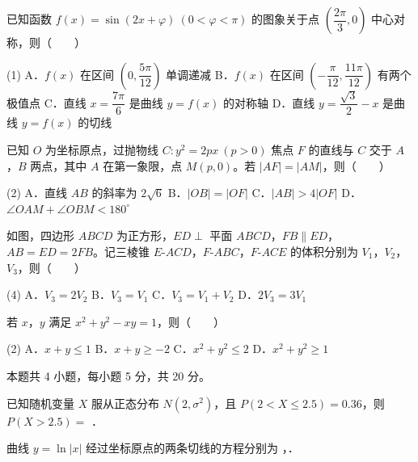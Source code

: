 已知函数 $f(x)=\sin(2x+\varphi)\ (0<\varphi<\pi)$ 的图象关于点 $\left(\dfrac{2\pi}3,0\right)$ 中心对称，则（　　）

\begin{gkopts}(1)
\task A．$f(x)$ 在区间 $\left(0,\dfrac{5\pi}{12}\right)$ 单调递减
\task B．$f(x)$ 在区间 $\left(-\dfrac\pi{12},\dfrac{11\pi}{12}\right)$ 有两个极值点
\task C．直线 $x=\dfrac{7\pi}6$ 是曲线 $y=f(x)$ 的对称轴
\task D．直线 $y=\dfrac{\sqrt3}2-x$ 是曲线 $y=f(x)$ 的切线
\end{gkopts}

已知 $O$ 为坐标原点，过抛物线 $C:y^{2}=2px\ (p>0)$ 焦点 $F$ 的直线与 $C$ 交于 $A$，$B$ 两点，其中 $A$ 在第一象限，点 $M(p,0)$。若 $|AF|=|AM|$，则（　　）

\begin{gkopts}(2)
\task A．直线 $AB$ 的斜率为 $2\sqrt6$
\task B．$|OB|=|OF|$
\task C．$|AB|>4|OF|$
\task D．$\angle OAM+\angle OBM<180^\circ$
\end{gkopts}

如图，四边形 $ABCD$ 为正方形，$ED\perp$ 平面 $ABCD$，$FB\parallel ED$，$AB=ED=2FB$。记三棱锥 $E\text{-}ACD$，$F\text{-}ABC$，$F\text{-}ACE$ 的体积分别为 $V_1$，$V_2$，$V_3$，则（　　）

\begin{center}\end{center}

\begin{gkopts}(4)
\task A．$V_3=2V_2$
\task B．$V_3=V_1$
\task C．$V_3=V_1+V_2$
\task D．$2V_3=3V_1$
\end{gkopts}

若 $x$，$y$ 满足 $x^{2}+y^{2}-xy=1$，则（　　）

\begin{gkopts}(2)
\task A．$x+y\le1$
\task B．$x+y\ge-2$
\task C．$x^{2}+y^{2}\le2$
\task D．$x^{2}+y^{2}\ge1$
\end{gkopts}

\par\medskip


\begin{gktip}
本题共 4 小题，每小题 5 分，共 20 分。
\end{gktip}

已知随机变量 $X$ 服从正态分布 $N\left(2,\sigma^{2}\right)$，且 $P(2<X\le2.5)=0.36$，则 $P(X>2.5)=$ \gkblank{}．

曲线 $y=\ln|x|$ 经过坐标原点的两条切线的方程分别为 \gkblank{}，\gkblank{}．

